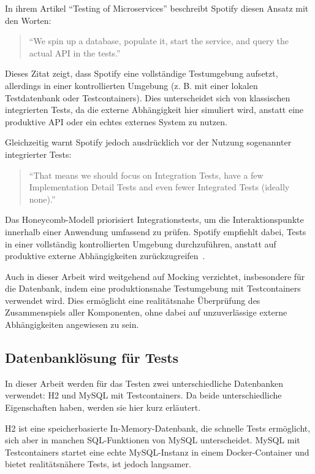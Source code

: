 In ihrem Artikel \enquote{Testing of Microservices} beschreibt Spotify diesen Ansatz mit den Worten: \begin{quote} \enquote{We spin up a database, populate it, start the service, and query the actual API in the tests.} \end{quote} Dieses Zitat zeigt, dass Spotify eine vollständige Testumgebung aufsetzt, allerdings in einer kontrollierten Umgebung (z. B. mit einer lokalen Testdatenbank oder Testcontainers). Dies unterscheidet sich von klassischen integrierten Tests, da die externe Abhängigkeit hier simuliert wird, anstatt eine produktive API oder ein echtes externes System zu nutzen.

Gleichzeitig warnt Spotify jedoch ausdrücklich vor der Nutzung sogenannter integrierter Tests:  
\begin{quote}
	\enquote{That means we should focus on Integration Tests, have a few Implementation Detail Tests and even fewer Integrated Tests (ideally none).}~\cite{Spotify18}
\end{quote}
Das Honeycomb-Modell priorisiert Integrationstests, um die Interaktionspunkte innerhalb einer Anwendung umfassend zu prüfen. Spotify empfiehlt dabei, Tests in einer vollständig kontrollierten Umgebung durchzuführen, anstatt auf produktive externe Abhängigkeiten zurückzugreifen~\cite{Spotify18}.

Auch in dieser Arbeit wird weitgehend auf Mocking verzichtet, insbesondere für die Datenbank, indem eine produktionsnahe Testumgebung mit Testcontainers verwendet wird. Dies ermöglicht eine realitätsnahe Überprüfung des Zusammenspiels aller Komponenten, ohne dabei auf unzuverlässige externe Abhängigkeiten angewiesen zu sein.


\subsection{Datenbanklösung für Tests}

In dieser Arbeit werden für das Testen zwei unterschiedliche Datenbanken verwendet: H2 und MySQL mit Testcontainers. Da beide unterschiedliche Eigenschaften haben, werden sie hier kurz erläutert.

H2 ist eine speicherbasierte In-Memory-Datenbank, die schnelle Tests ermöglicht, sich aber in manchen SQL-Funktionen von MySQL unterscheidet. MySQL mit Testcontainers startet eine echte MySQL-Instanz in einem Docker-Container und bietet realitätsnähere Tests, ist jedoch langsamer.
